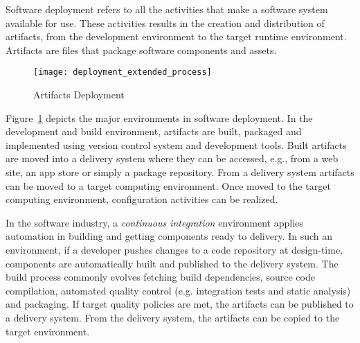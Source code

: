 Software deployment refers to all the activities that make a software system available for use\cite{carzaniga_characterization_1998}. These activities results
in the creation and distribution of artifacts,  from the development environment to the target runtime environment. Artifacts are files that package software components and assets.



\begin{figure}[!htb]
  \centering
  \texttt{[image: deployment\_extended\_process]}
  \caption{Artifacts Deployment}
  \label{fig:deployment_extended_process}
\end{figure}

Figure~\ref{fig:deployment_extended_process} depicts the major environments in software deployment.  In the development and build environment, artifacts are built, packaged and implemented using version control system and development tools. Built artifacts are moved into a delivery system where they can be accessed, e.g., from a web site, an app store or simply a package repository. From a delivery system artifacts can be moved to a target computing environment. Once moved to the target computing environment, configuration activities can be realized.

In the software industry, a \emph{continuous integration} environment applies automation in building and getting components ready to delivery. In such an environment, if a developer pushes changes to a code repository at design-time, components are automatically built and published to the delivery system. The build process commonly evolves fetching build dependencies, source code compilation, automated quality control (e.g. integration tests and static analysis) and packaging. If target quality policies are met, the artifacts can be published to a delivery system. From the delivery system, the artifacts can be copied to the target environment.

